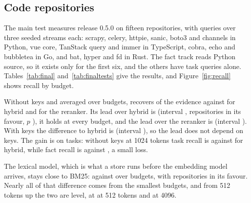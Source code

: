 \subsection{Code repositories}\label{sec:third}
The main test measures release 0.5.0 on fifteen repositories, with  queries over three seeded streams each: scrapy, celery, httpie, sanic, boto3 and channels in Python, vue core, TanStack query and immer in TypeScript, cobra, echo and bubbletea in Go, and bat, hyper and fd in Rust. The fact track reads Python source, so it exists only for the first six, and the others have task queries alone. Tables~\ref{tab:final} and~\ref{tab:finaltests} give the results, and Figure~\ref{fig:recall} shows recall by budget.

Without keys and averaged over budgets, \kanerva recovers  of the evidence against  for hybrid and  for the reranker. Its lead over hybrid is  (interval ,  repositories in its favour, $p$ ), it holds at every budget, and the lead over the reranker is  (interval ). With keys the difference to hybrid is  (interval ), so the lead does not depend on keys. The gain is on tasks: without keys at 1024 tokens task recall is  against  for hybrid, while fact recall is  against , a small loss.

The lexical model, which is what a store runs before the embedding model arrives, stays close to BM25:  against  over budgets, with  repositories in its favour. Nearly all of that difference comes from the smallest budgets, and from 512 tokens up the two are level, at  at 512 tokens and  at 4096.

